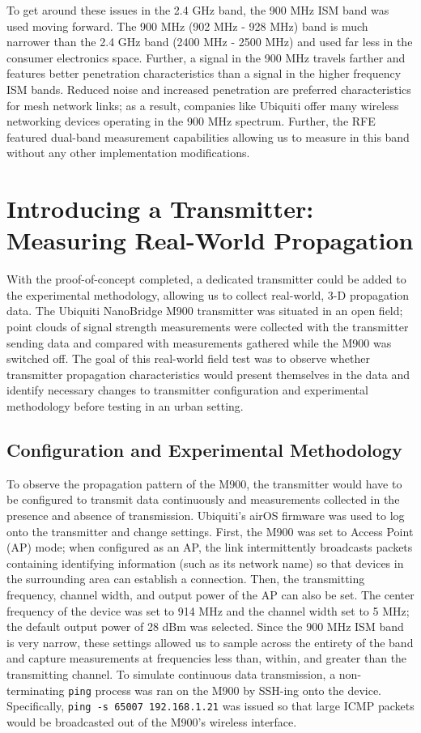 \documentclass[pageno]{jpaper}
\begin{document}
To get around these issues in the 2.4 GHz band, the 900 MHz ISM band was used moving forward. The 900 MHz (902 MHz - 928 MHz) band is much narrower than the 2.4 GHz band (2400 MHz - 2500 MHz) and used far less in the consumer electronics space. Further, a signal in the 900 MHz travels farther and features better penetration characteristics than a signal in the higher frequency ISM bands. Reduced noise and increased penetration are preferred characteristics for mesh network links; as a result, companies like Ubiquiti offer many wireless networking devices operating in the 900 MHz spectrum. Further, the RFE featured dual-band measurement capabilities allowing us to measure in this band without any other implementation modifications.

\section{Introducing a Transmitter: Measuring Real-World Propagation}
With the proof-of-concept completed, a dedicated transmitter could be added to the experimental methodology, allowing us to collect real-world, 3-D propagation data. The Ubiquiti NanoBridge M900 transmitter was situated in an open field; point clouds of signal strength measurements were collected with the transmitter sending data and compared with measurements gathered while the M900 was switched off. The goal of this real-world field test was to observe whether transmitter propagation characteristics would present themselves in the data and identify necessary changes to transmitter configuration and experimental methodology before testing in an urban setting.

\subsection{Configuration and Experimental Methodology}
To observe the propagation pattern of the M900, the transmitter would have to be configured to transmit data continuously and measurements collected in the presence and absence of transmission. Ubiquiti's airOS firmware was used to log onto the transmitter and change settings. First, the M900 was set to Access Point (AP) mode; when configured as an AP, the link intermittently broadcasts packets containing identifying information (such as its network name) so that devices in the surrounding area can establish a connection. Then, the transmitting frequency, channel width, and output power of the AP can also be set. The center frequency of the device was set to 914 MHz and the channel width set to 5 MHz; the default output power of 28 dBm was selected. Since the 900 MHz ISM band is very narrow, these settings allowed us to sample across the entirety of the band and capture measurements at frequencies less than, within, and greater than the transmitting channel. To simulate continuous data transmission, a  non-terminating \texttt{ping} process was ran on the M900 by SSH-ing onto the device. Specifically, \texttt{ping -s 65007 192.168.1.21} was issued so that large ICMP packets would be broadcasted out of the M900's wireless interface. 
\end{document}
